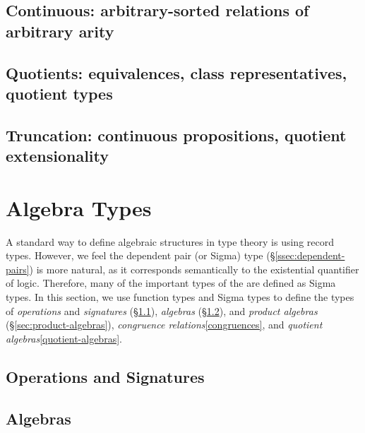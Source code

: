 \documentclass[a4paper,UKenglish,cleveref,autoref,thm-restate]{../lipics-v2021-wjd}
\begin{document}
\subsection{Continuous: arbitrary-sorted relations of arbitrary arity}\label{sec:continuous-relations}\firstsentence{\ualibContinuous}{\urlContinuous}

\subsection{Quotients: equivalences, class representatives, quotient types}\label{sec:equiv-relat-quot}\firstsentence{\ualibQuotients}{\urlQuotients}

\subsection{Truncation: continuous propositions, quotient extensionality}\label{sec:trunc-sets-prop}\firstsentence{\ualibTruncation}{\urlTruncation}


\section{Algebra Types}\label{sec:algebra-types}
A standard way to define algebraic structures in type theory is using record types.  However, we feel the dependent pair (or Sigma) type (\S\ref{ssec:dependent-pairs}) is more natural, as it corresponds semantically to the existential quantifier of logic. Therefore, many of the important types of the \ualib are defined as Sigma types. In this section, we use function types and Sigma types to define the types of \emph{operations} and \emph{signatures} (\S\ref{sec:oper-sign}), \emph{algebras} (\S\ref{sec:algebras}), and \emph{product algebras} (\S\ref{sec:product-algebras}), \emph{congruence relations}\ref{congruences}, and \emph{quotient algebras}\ref{quotient-algebras}.

\subsection{Operations and Signatures}\label{sec:oper-sign}\firstsentence{\ualibSignatures}{\urlSignatures}

\subsection{Algebras}\label{sec:algebras}\firstsentence{\ualibAlgAlgebras}{\urlAlgAlgebras}

\end{document}
